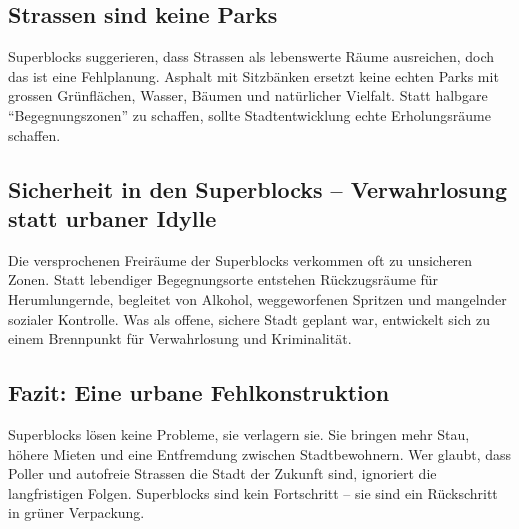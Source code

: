 \begin{tcolorbox}[title=Kontra-Argumente,
			parbox=false,
			colback=Crimson!10,
			colframe=Crimson,
			colbacktitle=Crimson]
\subsection*{Strassen sind keine Parks}
Superblocks suggerieren, dass Strassen als lebenswerte Räume ausreichen, doch das ist eine Fehlplanung. Asphalt mit Sitzbänken ersetzt keine echten Parks mit grossen Grünflächen, Wasser, Bäumen und natürlicher Vielfalt. Statt halbgare \enquote{Begegnungszonen} zu schaffen, sollte Stadtentwicklung echte Erholungsräume schaffen.

\subsection*{Sicherheit in den Superblocks -- Verwahrlosung statt urbaner Idylle}
Die versprochenen Freiräume der Superblocks verkommen oft zu unsicheren Zonen. Statt lebendiger Begegnungsorte entstehen Rückzugsräume für Herumlungernde, begleitet von Alkohol, weggeworfenen Spritzen und mangelnder sozialer Kontrolle. Was als offene, sichere Stadt geplant war, entwickelt sich zu einem Brennpunkt für Verwahrlosung und Kriminalität.

\subsection*{Fazit: Eine urbane Fehlkonstruktion}

Superblocks lösen keine Probleme, sie verlagern sie. Sie bringen mehr Stau, höhere Mieten und eine Entfremdung zwischen Stadtbewohnern. Wer glaubt, dass Poller und autofreie Strassen die Stadt der Zukunft sind, ignoriert die langfristigen Folgen. Superblocks sind kein Fortschritt -- sie sind ein Rückschritt in grüner Verpackung.


\end{tcolorbox}
\newpage
